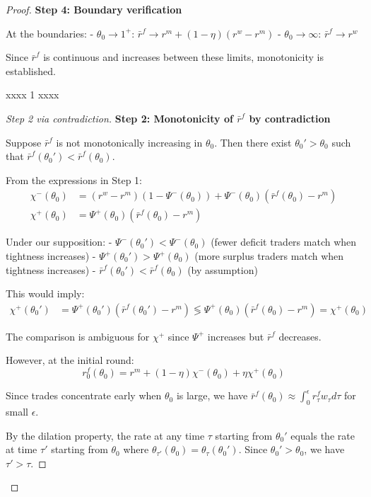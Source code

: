 \begin{proof}
\textbf{Step 4: Boundary verification}

At the boundaries:
- $\theta_0 \to 1^{+}$: $\bar{r}^f \to r^m + (1-\eta)(r^w - r^m)$
- $\theta_0 \to \infty$: $\bar{r}^f \to r^w$

Since $\bar{r}^f$ is continuous and increases between these limits, monotonicity is established.

xxxx 1 xxxx

\begin{proof}[Step 2 via contradiction]
\textbf{Step 2: Monotonicity of $\bar{r}^f$ by contradiction}

Suppose $\bar{r}^f$ is not monotonically increasing in $\theta_0$. Then there exist $\theta_0' > \theta_0$ such that $\bar{r}^f(\theta_0') < \bar{r}^f(\theta_0)$.

From the expressions in Step 1:
\begin{align}
\chi^{-}(\theta_0) &= (r^w - r^m)(1-\Psi^{-}(\theta_0)) + \Psi^{-}(\theta_0)(\bar{r}^f(\theta_0) - r^m)\\
\chi^{+}(\theta_0) &= \Psi^{+}(\theta_0)(\bar{r}^f(\theta_0) - r^m)
\end{align}

Under our supposition:
- $\Psi^{-}(\theta_0') < \Psi^{-}(\theta_0)$ (fewer deficit traders match when tightness increases)
- $\Psi^{+}(\theta_0') > \Psi^{+}(\theta_0)$ (more surplus traders match when tightness increases)
- $\bar{r}^f(\theta_0') < \bar{r}^f(\theta_0)$ (by assumption)

This would imply:
\begin{align}
\chi^{+}(\theta_0') &= \Psi^{+}(\theta_0')(\bar{r}^f(\theta_0') - r^m) \lessgtr \Psi^{+}(\theta_0)(\bar{r}^f(\theta_0) - r^m) = \chi^{+}(\theta_0)
\end{align}

The comparison is ambiguous for $\chi^{+}$ since $\Psi^{+}$ increases but $\bar{r}^f$ decreases.

However, at the initial round:
\[
r_0^f(\theta_0) = r^m + (1-\eta)\chi^{-}(\theta_0) + \eta\chi^{+}(\theta_0)
\]

Since trades concentrate early when $\theta_0$ is large, we have $\bar{r}^f(\theta_0) \approx \int_0^{\epsilon} r_{\tau}^f w_{\tau} d\tau$ for small $\epsilon$.

By the dilation property, the rate at any time $\tau$ starting from $\theta_0'$ equals the rate at time $\tau'$ starting from $\theta_0$ where $\theta_{\tau'}(\theta_0) = \theta_{\tau}(\theta_0')$. Since $\theta_0' > \theta_0$, we have $\tau' > \tau$.


\end{proof}
\end{proof}
